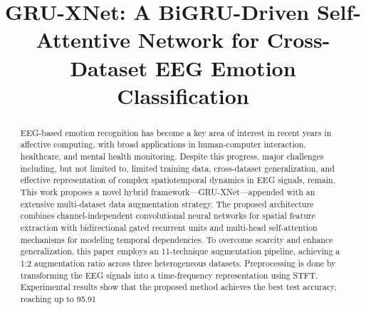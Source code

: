 \documentclass[conference]{IEEEtran}
\begin{document}
\title{GRU-XNet: A BiGRU-Driven Self-Attentive Network for Cross-Dataset EEG Emotion Classification
}

\author{
\and
{}
}

\maketitle

\begin{abstract}
EEG-based emotion recognition has become a key area of interest in recent years in affective computing, with broad applications in human-computer interaction, healthcare, and mental health monitoring. Despite this progress, major challenges including, but not limited to, limited training data, cross-dataset generalization, and effective representation of complex spatiotemporal dynamics in EEG signals, remain. This work proposes a novel hybrid framework---GRU-XNet---appended with an extensive multi-dataset data augmentation strategy. The proposed architecture combines channel-independent convolutional neural networks for spatial feature extraction with bidirectional gated recurrent units and multi-head self-attention mechanisms for modeling temporal dependencies. To overcome scarcity and enhance generalization, this paper employs an 11-technique augmentation pipeline, achieving a 1:2 augmentation ratio across three heterogeneous datasets. Preprocessing is done by transforming the EEG signals into a time-frequency representation using STFT. Experimental results show that the proposed method achieves the best test accuracy, reaching up to 95.91%
\end{abstract}
\end{document}
